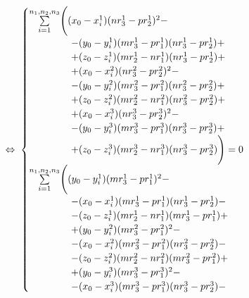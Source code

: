 \hfill \break \hfill \break
$$ \Leftrightarrow \; \begin{cases}
	\underset{i=1}{\overset{n_1, n_2, n_3}{\sum}} \Bigg( 
		(x_0 - x_i^1) (n r_3^1 - p r_2^1)^2 - \\
		\hspace{1.5cm} - (y_0 - y_i^1) (m r_3^1 - p r_1^1) (n r_3^1 - p r_2^1) + \\
		\hspace{1.5cm} + (z_0 - z_i^1) (m r_2^1 - n r_1^1) (n r_3^1 - p r_2^1) + \\
		\hspace{1.5cm} + (x_0 - x_i^2) (n r_3^2 - p r_2^2)^2 - \\
		\hspace{1.5cm} - (y_0 - y_i^2) (m r_3^2 - p r_1^2) (n r_3^2 - p r_2^2) + \\
		\hspace{1.5cm} + (z_0 - z_i^2) (m r_2^2 - n r_1^2) (n r_3^2 - p r_2^2) + \\
		\hspace{1.5cm} + (x_0 - x_i^3) (n r_3^3 - p r_2^3)^2 - \\
		\hspace{1.5cm} - (y_0 - y_i^3) (m r_3^3 - p r_1^3) (n r_3^3 - p r_2^3) + \\
		\hspace{1.5cm} + (z_0 - z_i^3) (m r_2^3 - n r_1^3) (n r_3^3 - p r_2^3) \Bigg) = 0 \\
	\underset{i=1}{\overset{n_1, n_2, n_3}{\sum}} \Bigg( 
		(y_0 - y_i^1) (m r_3^1 - p r_1^1)^2 - \\
		\hspace{1.5cm} - (x_0 - x_i^1) (m r_3^1 - p r_1^1) (n r_3^1 - p r_2^1) - \\
		\hspace{1.5cm} - (z_0 - z_i^1) (m r_2^1 - n r_1^1) (m r_3^1 - p r_1^1) + \\
		\hspace{1.5cm} + (y_0 - y_i^2) (m r_3^2 - p r_1^2)^2 - \\
		\hspace{1.5cm} - (x_0 - x_i^2) (m r_3^2 - p r_1^2) (n r_3^2 - p r_2^2) - \\
		\hspace{1.5cm} - (z_0 - z_i^2) (m r_2^2 - n r_1^2) (m r_3^2 - p r_1^2) + \\
		\hspace{1.5cm} + (y_0 - y_i^3) (m r_3^3 - p r_1^3)^2 - \\
		\hspace{1.5cm} - (x_0 - x_i^3) (m r_3^3 - p r_1^3) (n r_3^3 - p r_2^3) - \\

\end{cases}$$
